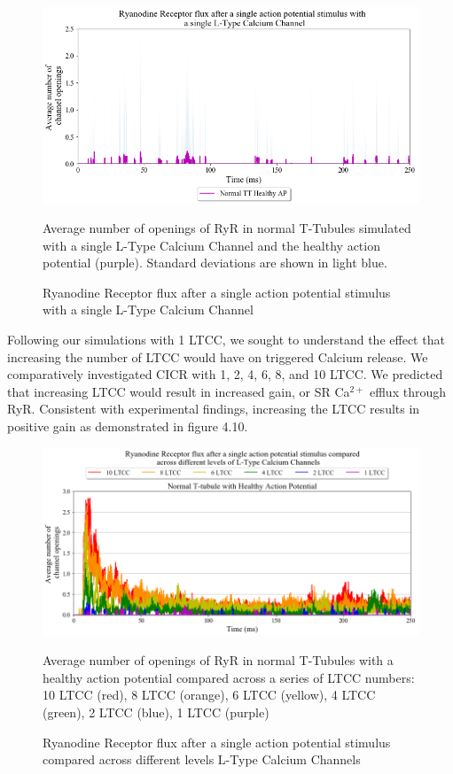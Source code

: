 \documentclass[12pt]{ucsddissertation}
\begin{document}
\setcounter{figure}{8}
\begin{figure}
	\includegraphics[scale=0.55]{RyRflux_1AP_1LTCC.png}
	\caption{Ryanodine Receptor flux after a single action potential stimulus with a single L-Type Calcium Channel} Average number of openings of RyR in normal T-Tubules simulated with a single L-Type Calcium Channel and the healthy action potential (purple). Standard deviations are shown in light blue.
\label{fig:RyR flux 1 LTCC} 
\end{figure}

Following our simulations with 1 LTCC, we sought to understand the effect that increasing the number of LTCC would have on triggered Calcium release. We comparatively investigated CICR with 1, 2, 4, 6, 8, and 10 LTCC. We predicted that increasing LTCC would result in increased gain, or SR Ca$^{2+}$ efflux through RyR. Consistent with experimental findings, \cite{Cannell1995} increasing the LTCC results in positive gain as demonstrated in figure 4.10.

\setcounter{figure}{9}
\begin{figure}
	\includegraphics[scale=0.5]{RyRflux_1AP_LTCC_hn_Comparison.png}
	\caption{Ryanodine Receptor flux after a single action potential stimulus compared across different levels L-Type Calcium Channels} Average number of openings of RyR in normal T-Tubules with a healthy action potential compared across a series of LTCC numbers: 10 LTCC (red), 8 LTCC (orange), 6 LTCC (yellow), 4 LTCC (green), 2 LTCC (blue), 1 LTCC (purple)
\label{fig:hnhd 1 AP LTCC RyR } 
\end{figure}
\end{document}

